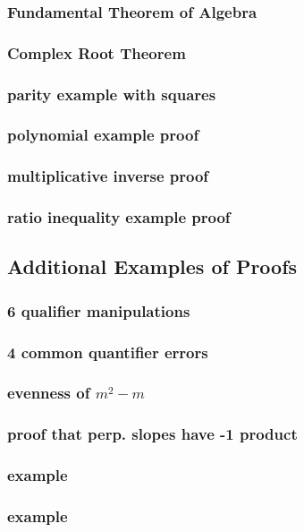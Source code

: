 \documentclass[a4paper]{article}
\begin{document}
\subsubsection*{Fundamental Theorem of Algebra}
\subsubsection*{Complex Root Theorem}
\subsubsection*{parity example with squares}
\subsubsection*{polynomial example proof}
\subsubsection*{multiplicative inverse proof}
\subsubsection*{ratio inequality example proof}
\subsection{Additional Examples of Proofs}   %
\subsubsection*{6 qualifier manipulations}
\subsubsection*{4 common quantifier errors}
\subsubsection*{evenness of $m^2-m$}
\subsubsection*{proof that perp. slopes have -1 product}
\subsubsection*{example}
\subsubsection*{example}
\end{document}
